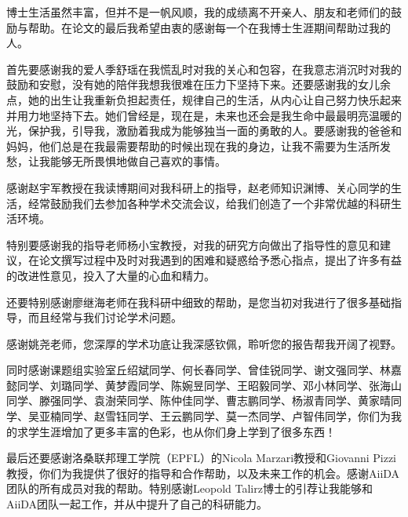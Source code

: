 \documentclass[phd,nobackinfo]{scutthesis}
\begin{document}
\begin{acknowledgement}
  博士生活虽然丰富，但并不是一帆风顺，我的成绩离不开亲人、朋友和老师们的鼓励与帮助。在论文的最后我希望由衷的感谢每一个在我博士生涯期间帮助过我的人。

  首先要感谢我的爱人季舒瑶在我慌乱时对我的关心和包容，在我意志消沉时对我的鼓励和安慰，没有她的陪伴我想我很难在压力下坚持下来。还要感谢我的女儿余点，她的出生让我重新负担起责任，规律自己的生活，从内心让自己努力快乐起来并用力地坚持下去。她们曾经是，现在是，未来也还会是我生命中最最明亮温暖的光，保护我，引导我，激励着我成为能够独当一面的勇敢的人。要感谢我的爸爸和妈妈，他们总是在我最需要帮助的时候出现在我的身边，让我不需要为生活所发愁，让我能够无所畏惧地做自己喜欢的事情。

  感谢赵宇军教授在我读博期间对我科研上的指导，赵老师知识渊博、关心同学的生活，经常鼓励我们去参加各种学术交流会议，给我们创造了一个非常优越的科研生活环境。

  特别要感谢我的指导老师杨小宝教授，对我的研究方向做出了指导性的意见和建议，在论文撰写过程中及时对我遇到的困难和疑惑给予悉心指点，提出了许多有益的改进性意见，投入了大量的心血和精力。

  还要特别感谢廖继海老师在我科研中细致的帮助，是您当初对我进行了很多基础指导，而且经常与我们讨论学术问题。

  感谢姚尧老师，您深厚的学术功底让我深感钦佩，聆听您的报告帮我开阔了视野。

  同时感谢课题组实验室丘绍斌同学、何长春同学、曾佳锐同学、谢文强同学、林嘉懿同学、刘璐同学、黄梦霞同学、陈婉昱同学、王昭毅同学、邓小林同学、张海山同学、滕强同学、袁澍荣同学、陈仲佳同学、曹志鹏同学、杨淑青同学、黄家晴同学、吴亚楠同学、赵雪钰同学、王云鹏同学、莫一杰同学、卢智伟同学，你们为我的求学生涯增加了更多丰富的色彩，也从你们身上学到了很多东西！

  最后还要感谢洛桑联邦理工学院（EPFL）的Nicola Marzari教授和Giovanni Pizzi教授，你们为我提供了很好的指导和合作帮助，以及未来工作的机会。感谢AiiDA团队的所有成员对我的帮助。特别感谢Leopold Talirz博士的引荐让我能够和AiiDA团队一起工作，并从中提升了自己的科研能力。

\end{acknowledgement}
\end{document}
